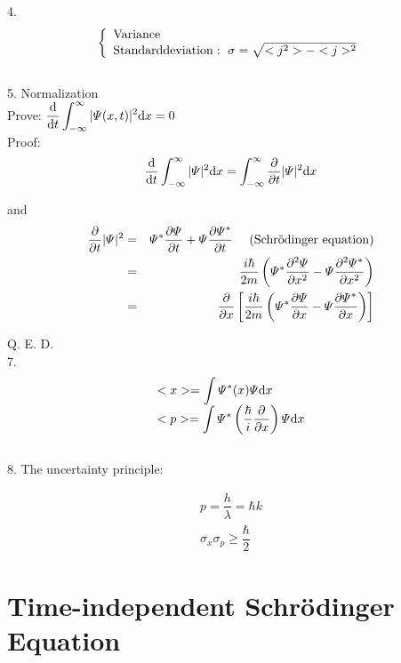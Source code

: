 \documentclass[12pt, 
]{article}
\begin{document}
	4. \[
		\left\{
		\begin{array}{l}
			{\rm Variance}\\
			{\rm Standard deviation}:~\sigma=\sqrt{<j^2>-<j>^2}\\
		\end{array}
		\right.
		\]
	~\\
		
	5. Normalization
	~\\

	Prove: $\displaystyle\frac{{\rm d}}{{\rm d}t}\int^{\infty}_{-\infty}|\varPsi(x,t)|^2{\rm d}x=0$
	~\\

	Proof:
	$$\frac{{\rm d}}{{\rm d}t}\int_{-\infty}^{\infty}|\varPsi|^2{\rm d}x=\int_{-\infty}^{\infty}\frac{\partial}{\partial t}|\varPsi|^2{\rm d}x$$
	
	and 
	\begin{eqnarray*}
	\frac{\partial}{\partial t}|\varPsi|^2&=&\varPsi^*\frac{\partial \varPsi}{\partial t}+\varPsi\frac{\partial \varPsi^*}{\partial t}~~~~(\rm{Schr\ddot{o}dinger~equation})\\
	&=&\frac{i\hbar}{2m}\left(\varPsi^*\frac{\partial^2\varPsi}{\partial x^2}-\varPsi\frac{\partial^2\varPsi^*}{\partial x^2}\right)\\
	&=&\frac{\partial}{\partial x}\left[\frac{i\hbar}{2m}\left(\varPsi^*\frac{\partial \varPsi}{\partial x}-\varPsi\frac{\partial \varPsi^*}{\partial x}\right)\right]
	\end{eqnarray*}
	
	Q. E. D.
	~\\

	7.\[
		\begin{array}{l}
		<x>=\displaystyle\int\varPsi^*(x)\varPsi{\rm d}x\\
		<p>=\displaystyle\int\varPsi^*\left(\frac{\hbar}{i}\frac{\partial}{\partial x}\right)\varPsi{\rm d}x
		\end{array}
		\]
	~\\

	8. The uncertainty principle:

	\[
		\begin{array}{l}
			p=\dfrac{h}{\lambda}=\hbar k\\
			\sigma_x\sigma_p\geqslant \dfrac{\hbar}{2}
		\end{array}
		\]
	\newpage

	\section{Time-independent Schr\"odinger Equation}
\end{document}
